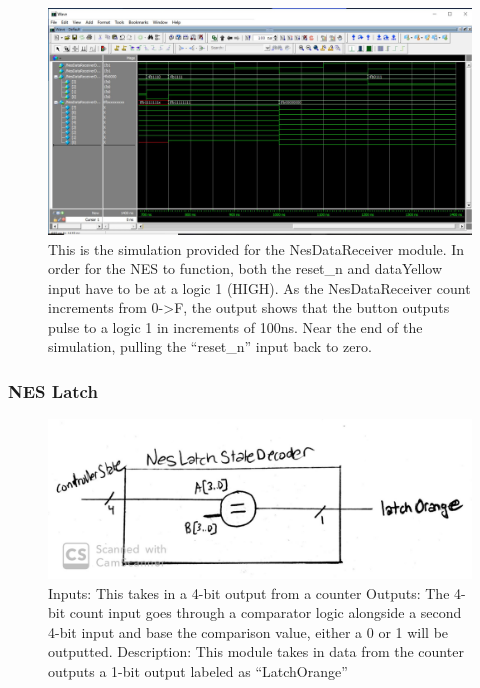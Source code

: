 \documentclass[a4paper]{article}
\begin{document}
\begin{figure}[H]
  \centering
    \includegraphics[width=.85\textwidth]{images/ModelSim/nesdatare2.JPG}
	\caption{This is the simulation provided for the NesDataReceiver module. In order for the NES to function, both the reset_n and dataYellow input have to be at a logic 1 (HIGH). As the NesDataReceiver count increments from 0->F, the output shows that the button outputs pulse to a logic 1 in increments of 100ns. Near the end of the simulation, pulling the “reset_n” input back to zero.}
    \label{fig:data_receiver_sim}
\end{figure}

\subsubsection{NES Latch}

\begin{figure}[H]
  \centering
    \includegraphics[width=.85\textwidth]{images/block_diagrams/nes/latch3.jpg}
	\caption{Inputs: This takes in a 4-bit output from a counter
Outputs: The 4-bit count input goes through a comparator logic alongside a second 4-bit input and base the comparison value, either a 0 or 1 will be outputted.
Description: This module takes in data from the counter outputs a 1-bit output labeled as “LatchOrange”}
    \label{fig:latch}
\end{figure}
\end{document}
